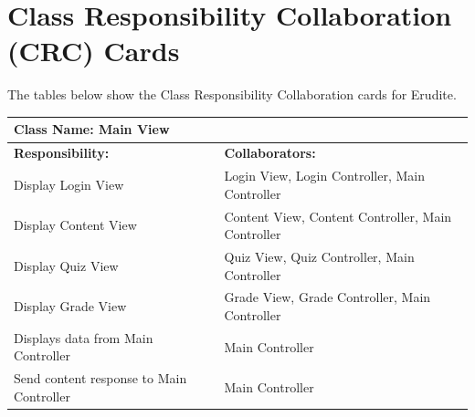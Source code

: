 \documentclass[]{article}
\begin{document}


\section{Class Responsibility Collaboration (CRC) Cards}
\label{sec:class_responsibility_collaboration_crc_cards}
The tables below show the Class Responsibility Collaboration cards for Erudite.
	
	
	\begin{table}[H]
	\centering
		\begin{tabular}{|p{9cm}|p{3cm}|}
		\hline
		 \multicolumn{2}{|l|}{\textbf{Class Name: Main View}} \\
		\hline
		\textbf{Responsibility:} & \textbf{Collaborators:} \\
		\hline
	    Display Login View & Login View, Login Controller, Main Controller\\
		\hline
		Display Content View & Content View, Content Controller, Main Controller 	\\
		\hline
		Display Quiz View & Quiz View, Quiz Controller, Main Controller\\
		\hline
		Display Grade View & Grade View, Grade Controller, Main Controller\\
		\hline 
		Displays data from Main Controller & Main Controller\\
		\hline
		Send content response to Main Controller & Main Controller\\
		\hline
		\end{tabular}
	\end{table}	
	
\end{document}
